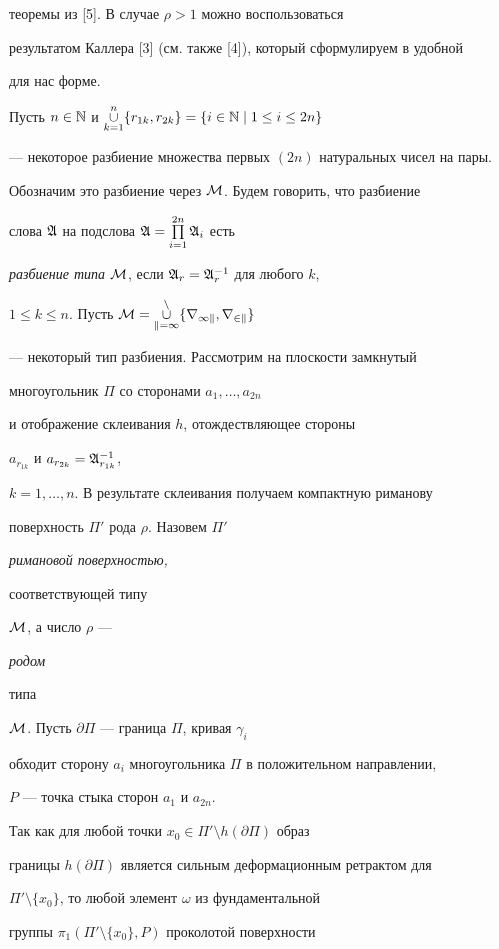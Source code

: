 теоремы из [5]. В случае $\rho>1$ можно воспользоваться 


результатом Каллера [3] (см. также [4]), который сформулируем в удобной


для нас форме.





Пусть $n\in\Bbb N$ и $\mathop{\cup}\limits_{k=1}^n


\{r_{1k},r_{2k}\}=\{i\in\Bbb N\mid 1\le i\le 2n\}$


--- некоторое разбиение множества первых $(2n)$ натуральных чисел на пары.


Обозначим это разбиение через $\cal M$. Будем говорить, что разбиение 


слова $\frak A$ на подслова $\frak A=\prod\limits_{i=1}^{2n}\frak A_i$ есть


{\it разбиение типа} $\cal M$, если $\frak A_r=\frak A^{-1}_r$ для любого $k$,


$1\le k\le n$. Пусть $\cal M=\mathop{\cup}\limits_{k=1}^n\{r_{1k},r_{2k}\}$


--- некоторый тип разбиения. Рассмотрим на плоскости замкнутый


многоугольник $\Pi$ со сторонами $a_1,\dotsc,a_{{2n}}$


и отображение склеивания $h$, отождествляющее стороны


$a_{r_{1k}}$ и $a_{r_{2k}}=\frak A^{-1}_{r_{1k}}$,


$k=1,\dotsc,n$. В результате склеивания получаем компактную риманову


поверхность $\Pi'$ рода $\rho$. Назовем $\Pi'$ {\it римановой поверхностью,


соответствующей типу} $\cal M$, а число $\rho $ --- {\it родом


типа} $\cal M$. Пусть $\partial \Pi$ --- граница $\Pi$, кривая $\gamma_i$


обходит сторону $a_i$ многоугольника $\Pi$ в положительном направлении,


$P$ --- точка стыка сторон $a_1$ и $a_{2n}$.





Так как для любой точки $x_0\in \Pi'\setminus h(\partial \Pi)$ образ


границы $h(\partial \Pi)$ является сильным деформационным ретрактом для


$\Pi'\setminus\{x_0\}$, то любой элемент $\omega$ из фундаментальной


группы $\pi_1(\Pi' \setminus \{x_0\},P)$ проколотой поверхности


